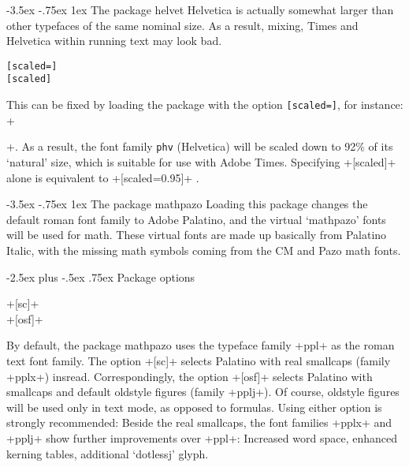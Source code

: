 \documentclass[11pt]{ltxguide}[1995/11/28]
\makeatletter
\renewcommand\section{\@startsection{section}{1}{\z@}%
{-3.5ex \@plus -.75ex}%
{1ex}%
{\normalfont\Large\bfseries}}
\renewcommand\subsection{\@startsection{subsection}{2}{\z@}%
{-2.5ex plus -.5ex}%
{.75ex}%
{\normalfont\large\bfseries}}
\newcommand{\Lpack}[1]{\textsf{#1}}
\makeatother
\begin{document}
\section{The package \Lpack{helvet}}
\label{sec:helvet}
Helvetica is actually somewhat larger than other typefaces
of the same nominal size.
As a result, mixing, \eg Times and Helvetica within running text
may look bad.
\begin{decl}
  \texttt{[scaled=}\texttt{]}\\
  \texttt{[scaled]}
\end{decl}
This can be fixed by loading the package with the option
\texttt{[scaled=}\texttt{]},
for instance:
+\usepackage[scaled=.92]{helvet}+.
As a result, the font family \texttt{phv} (Helvetica) will be
scaled down to 92\% of its `natural' size, which is suitable
for use with Adobe Times.
Specifying +[scaled]+ alone is equivalent to +[scaled=0.95]+%
.



\section{The package \Lpack{mathpazo}}
\label{sec:mathpazo}
Loading
this package changes the default roman font family
to Adobe Palatino, and the virtual `mathpazo' fonts will be used
for math.
These virtual fonts are made up basically from Palatino Italic, with the
missing math symbols coming from the CM and Pazo math fonts.

\subsection{Package options}

\begin{decl}
  +[sc]+\\
  +[osf]+
\end{decl}
By default, the package \Lpack{mathpazo} uses
the typeface family +ppl+ as the roman text font family.
The option +[sc]+ selects Palatino with real smallcaps (family +pplx+) insread.
Correspondingly, the option +[osf]+ selects Palatino with smallcaps and default
oldstyle figures (family +pplj+).
Of course, oldstyle figures will be used only in text mode, as opposed to formulas.
Using either option is strongly recommended:
Beside the real smallcaps, the font families +pplx+ and +pplj+ show  further
improvements over +ppl+: Increased word space, enhanced kerning tables,
additional `dotlessj' glyph.
\end{document}
